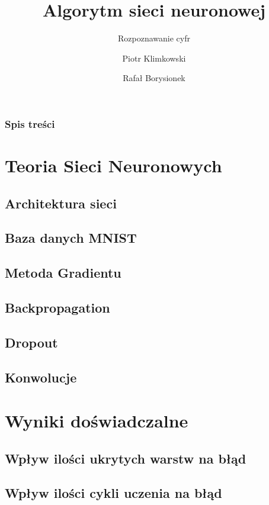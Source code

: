 \documentclass{beamer}
\title[Sieć neuronowa- rozpoznawanie cyfr]
{Algorytm sieci neuronowej}
\subtitle{Rozpoznawanie cyfr}
\author[Piotr Klimkowski  \and Rafał Borysionek]
{Piotr Klimkowski \and Rafał Borysionek}
\institute[]
{Wydział Elektroniki \\
Politechnika Wrocławska
}
\begin{document}
\begin{frame}
  \titlepage
\end{frame}


\begin{frame}
  \frametitle{Spis treści}
  \tableofcontents
\end{frame}

\section{Teoria Sieci Neuronowych}

\subsection{Architektura sieci}
\subsection{Baza danych MNIST}
\subsection{Metoda Gradientu}
\subsection{Backpropagation}
\subsection{Dropout}
\subsection{Konwolucje}

\section{Wyniki doświadczalne}
\subsection{Wpływ ilości ukrytych warstw na błąd}
\subsection{Wpływ ilości cykli uczenia na błąd}
\end{document}
